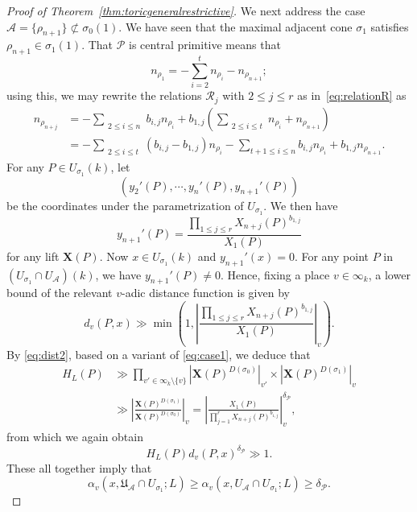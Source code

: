 \documentclass[a4paper, twoside, 11pt]{amsart}
\theoremstyle{definition}
\newcommand{\CR}{{\mathcal{R}}}
\newcommand{\cA}{\mathcal{A}}
\newcommand{\cP}{\mathcal{P}}
\newcommand{\bX}{{\boldsymbol{X}}}
\newcommand{\mU}{\mathfrak{U}}
\begin{document}
\begin{proof}[Proof of Theorem~\ref{thm:toricgeneralrestrictive}]
We next address the case $\cA=\{\rho_{n+1}\}\not\subset \sigma_0(1)$. 
We have seen that the maximal adjacent cone $\sigma_1$ satisfies $\rho_{n+1}\in\sigma_1(1)$. 
That $\cP$ is central primitive means that 
\begin{equation*}
	n_{\rho_1}=-\sum_{i=2}^{t}n_{\rho_i}-n_{\rho_{n+1}};
\end{equation*}
using this, we may rewrite the relations $\CR_j$ with $2\le j\le r$ as in~\eqref{eq:relationR} as
\begin{align*}
    n_{\rho_{n+j}}&=-\sum_{\substack{2\leq i\leq n}}b_{i,j}n_{\rho_i}+b_{1,j}\left(\sum_{\substack{2\leq i\leq t}}n_{\rho_i}+n_{\rho_{n+1}}\right)\\ &=-\sum_{\substack{2\leq i\leq t}}(b_{i,j}-b_{1,j})n_{\rho_i}-\sum_{t+1\leq i\leq n} b_{i,j}n_{\rho_i}+b_{1,j}n_{\rho_{n+1}}.
\end{align*}
 For any $P\in U_{\sigma_1}(k)$, let $$(y_2'(P),\cdots,y_{n}'(P),y_{n+1}'(P))$$ be the coordinates under the parametrization of $U_{\sigma_1}$. We then have
\begin{equation*}
	y_{n+1}'(P)=\frac{\prod_{1\leq j\leq r}X_{n+j}(P)^{b_{1,j}}}{X_1(P)}
\end{equation*}  
for  any lift $\bX(P)$.
Now $x\in U_{\sigma_1}(k)$ and $y_{n+1}'(x)=0$.
For any point $P$ in $(U_{\sigma_1}\cap U_{\cA})(k)$, we have $y_{n+1}'(P)\neq 0$. Hence, fixing a place $v\in\infty_k$, a lower bound of the relevant $v$-adic distance function is given by
\begin{equation}\label{eq:dist2}
	d_v(P,x)\gg \min\left(1,\left|\frac{\prod_{1\leq j\leq r}X_{n+j}(P)^{b_{1,j}}}{X_1(P)}\right|_v\right).
\end{equation} 
By \eqref{eq:dist2}, based on a variant of \eqref{eq:case1}, we deduce that \begin{align*}
H_L(P)&\gg \prod_{v'\in\infty_k\setminus\{v\}}\left|\bX(P)^{D(\sigma_0)}\right|_{v'}\times \left|\bX(P)^{D(\sigma_1)}\right|_{v}\\ &\gg \left|\frac{\bX(P)^{D(\sigma_1)}}{\bX(P)^{D(\sigma_0)}}\right|_{v}=\left|\frac{X_1(P)}{\prod_{j=1}^{r}X_{n+j}(P)^{{b}_{1,j}}}\right|_{v}^{\delta_{\cP}},\end{align*} from which we again obtain $$H_L(P)d_v(P,x)^{\delta_\cP}\gg 1.$$ 
These all together imply that $$\alpha_v(x,\mU_{\cA}\cap U_{\sigma_1};L)\geq \alpha_v(x,U_{\cA}\cap U_{\sigma_1};L)\geq\delta_\cP.$$


\end{proof}
\end{document}
